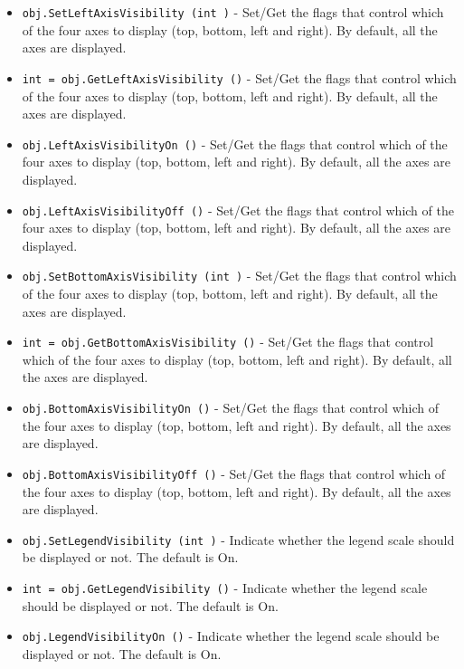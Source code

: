\begin{itemize}
\item  \verb|obj.SetLeftAxisVisibility (int )| -  Set/Get the flags that control which of the four axes to display (top,
 bottom, left and right). By default, all the axes are displayed.

\item  \verb|int = obj.GetLeftAxisVisibility ()| -  Set/Get the flags that control which of the four axes to display (top,
 bottom, left and right). By default, all the axes are displayed.

\item  \verb|obj.LeftAxisVisibilityOn ()| -  Set/Get the flags that control which of the four axes to display (top,
 bottom, left and right). By default, all the axes are displayed.

\item  \verb|obj.LeftAxisVisibilityOff ()| -  Set/Get the flags that control which of the four axes to display (top,
 bottom, left and right). By default, all the axes are displayed.

\item  \verb|obj.SetBottomAxisVisibility (int )| -  Set/Get the flags that control which of the four axes to display (top,
 bottom, left and right). By default, all the axes are displayed.

\item  \verb|int = obj.GetBottomAxisVisibility ()| -  Set/Get the flags that control which of the four axes to display (top,
 bottom, left and right). By default, all the axes are displayed.

\item  \verb|obj.BottomAxisVisibilityOn ()| -  Set/Get the flags that control which of the four axes to display (top,
 bottom, left and right). By default, all the axes are displayed.

\item  \verb|obj.BottomAxisVisibilityOff ()| -  Set/Get the flags that control which of the four axes to display (top,
 bottom, left and right). By default, all the axes are displayed.

\item  \verb|obj.SetLegendVisibility (int )| -  Indicate whether the legend scale should be displayed or not.
 The default is On.

\item  \verb|int = obj.GetLegendVisibility ()| -  Indicate whether the legend scale should be displayed or not.
 The default is On.

\item  \verb|obj.LegendVisibilityOn ()| -  Indicate whether the legend scale should be displayed or not.
 The default is On.


\end{itemize}
